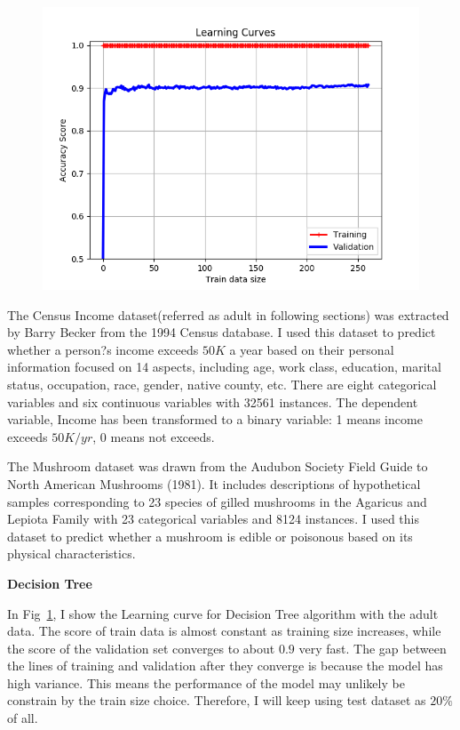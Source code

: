 \documentclass[         %
aps,                    %
prl,                    %
showpacs,               %
superscriptaddress,    %
nofootinbib,            %
twocolumn,             %
showkeys,               %
preprintnumbers,        %
floatfix               %
]{revtex4-1}               %
\begin{document}
\begin{figure}[h!]
  \centering \includegraphics[width=\linewidth]{../DT_adult_LearningCurve}
  \caption{\label{fig:dt_lc_Income}}
\end{figure}

The Census Income dataset(referred as adult in following sections) was extracted by Barry Becker from the 1994 Census database. 
I used this dataset to predict whether a person?s income exceeds $50K$ a year based on their personal information focused on 14 aspects, including age, work class, education, marital status, occupation, race, gender, native county, etc. 
There are eight categorical variables and six continuous variables with 32561 instances. 
The dependent variable, Income has been transformed to a binary variable: 1 means income exceeds $50K/yr$, 0 means not exceeds. 

The Mushroom dataset was drawn from the Audubon Society Field Guide to North American Mushrooms (1981). 
It includes descriptions of hypothetical samples corresponding to 23 species of gilled mushrooms in the Agaricus and Lepiota Family with 23 categorical variables and 8124 instances. 
I used this dataset to predict whether a mushroom is edible or poisonous based on its physical characteristics. 

{\bf Decision Tree}\label{dt}

In Fig~\ref{fig:dt_lc_Income}, I show the Learning curve for Decision Tree algorithm with the adult data. 
The score of train data is almost constant as training size increases, while the score of the validation set converges to about $0.9$ very fast.
The gap between the lines of training and validation after they converge is because the model has high variance. 
This means the performance of the model may unlikely be constrain by the train size choice. Therefore, I will keep using test dataset as $20\%$ of all. 
\end{document}

